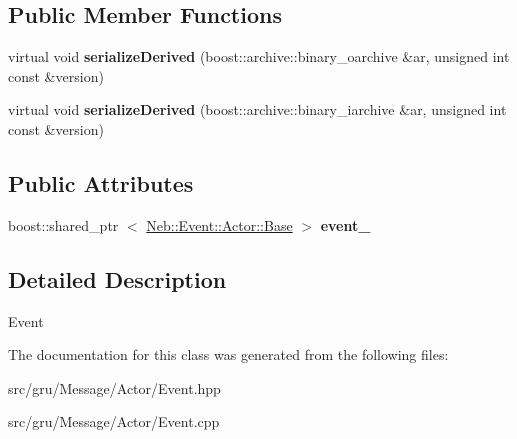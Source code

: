\subsection*{\-Public \-Member \-Functions}
\begin{DoxyCompactItemize}
\item 
\hypertarget{classNeb_1_1Message_1_1Actor_1_1Event_ab2f1e7d17327e3c8210fe6fe6f2e06a4}{virtual void {\bfseries serialize\-Derived} (boost\-::archive\-::binary\-\_\-oarchive \&ar, unsigned int const \&version)}\label{classNeb_1_1Message_1_1Actor_1_1Event_ab2f1e7d17327e3c8210fe6fe6f2e06a4}

\item 
\hypertarget{classNeb_1_1Message_1_1Actor_1_1Event_aec237654134680923acd2db99e061098}{virtual void {\bfseries serialize\-Derived} (boost\-::archive\-::binary\-\_\-iarchive \&ar, unsigned int const \&version)}\label{classNeb_1_1Message_1_1Actor_1_1Event_aec237654134680923acd2db99e061098}

\end{DoxyCompactItemize}
\subsection*{\-Public \-Attributes}
\begin{DoxyCompactItemize}
\item 
\hypertarget{classNeb_1_1Message_1_1Actor_1_1Event_a6b631077ba9edd5eda8a7a7257542f45}{boost\-::shared\-\_\-ptr\*
$<$ \hyperlink{classNeb_1_1Event_1_1Actor_1_1Base}{\-Neb\-::\-Event\-::\-Actor\-::\-Base} $>$ {\bfseries event\-\_\-}}\label{classNeb_1_1Message_1_1Actor_1_1Event_a6b631077ba9edd5eda8a7a7257542f45}

\end{DoxyCompactItemize}


\subsection{\-Detailed \-Description}
\-Event 

\-The documentation for this class was generated from the following files\-:\begin{DoxyCompactItemize}
\item 
src/gru/\-Message/\-Actor/\-Event.\-hpp\item 
src/gru/\-Message/\-Actor/\-Event.\-cpp\end{DoxyCompactItemize}
